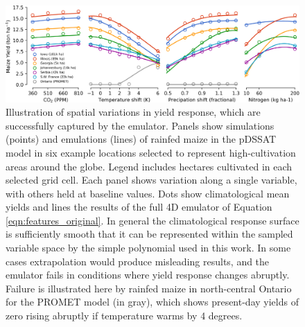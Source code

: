 \documentclass[gmd, manuscript]{copernicus} %
\begin{document}
\begin{figure}[ht]
\centering
    \includegraphics[width=16.3cm]{figures/regression_example_1.png}
    \caption{
    Illustration of spatial variations in yield response, which are successfully captured by the emulator. 
    Panels show simulations (points) and emulations (lines) of rainfed maize in the pDSSAT model in six example locations selected to represent high-cultivation areas around the globe. 
    Legend includes hectares cultivated in each selected grid cell. 
    Each panel shows variation along a single variable, with others held at baseline values. 
    Dots show climatological mean yields and lines the results of the full 4D emulator of Equation \ref{eqn:features_original}. 
    In general the climatological response surface is sufficiently smooth that it can be represented within the sampled variable space by the simple polynomial used in this work. 
    In some cases extrapolation would produce misleading results, and the emulator fails in conditions where yield response changes abruptly. 
    Failure is illustrated here by rainfed maize in north-central Ontario for the PROMET model (in gray), which shows present-day yields of zero rising abruptly if temperature warms by 4 degrees.
    }
   \label{fig:regression}
\end{figure}
\end{document}
